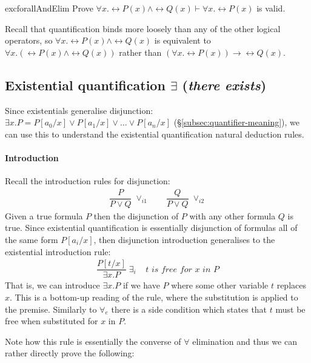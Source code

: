 \begin{restatable}{exc}{forallAndElim}
  Prove $\forall x . \rel{P}(x) \wedge \rel{Q}(x) \vdash \forall x
  . \rel{P}(x)$ is valid.
\end{restatable}
%
\begin{remark}
Recall that quantification binds more loosely than
any of the other logical operators, so $\forall x . \rel{P}(x)
\wedge \rel{Q}(x)$ is equivalent to $\forall x . (\rel{P}(x) \wedge
\rel{Q}(x))$ rather than $(\forall x . \rel{P} (x)) \rightarrow
\rel{Q}(x)$.
\end{remark}

\subsection{Existential quantification $\exists$ (\emph{there exists})}

Since existentials generalise disjunction:
$\exists x . P = P[a_0/x] \vee P[a_1/x] \vee
\ldots \vee P[a_{n}/x]$ (\S\ref{subsec:quantifier-meaning}),
we can use this to understand the
existential quantification natural deduction rules.

\paragraph{Introduction} Recall the introduction rules for disjunction:
%
\begin{align*}
    \dfrac{P}
  {P \vee Q} \; {\vee_{i1}}
  \qquad
    \dfrac{Q}
  {P \vee Q} \; {\vee_{i2}}
\end{align*}
%
Given a true formula $P$ then the disjunction of $P$ with any other
formula $Q$ is true. Since existential quantification is essentially
disjunction of formulas all of the same form $P[a_i/x]$, then
disjunction introduction generalises to the existential
introduction rule:
%
\begin{align*}
\dfrac{P[t/x]}{\exists x . P} \; \exists_i \;\;\;\;
\textit{$t$ is free for $x$ in $P$}
\end{align*}
%
That is, we can introduce $\exists x . P$ if we have
$P$ where some other variable $t$ replaces $x$. This
is a bottom-up reading of the rule, where the substitution
is applied to the premise. Similarly to $\forall_e$ there is a
side condition which states that $t$ must be free when substituted
for $x$ in $P$.

Note how this rule is essentially
the converse of $\forall$ elimination and thus we can
rather directly prove the following:

